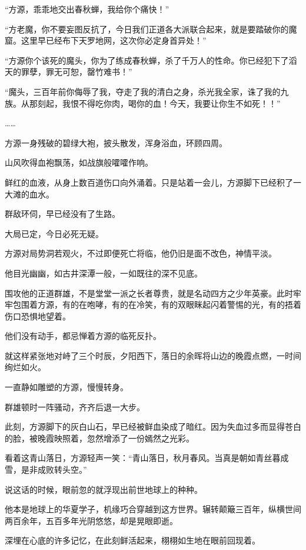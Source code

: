 
\begin{this_body}

“方源，乖乖地交出春秋蝉，我给你个痛快！”

“方老魔，你不要妄图反抗了，今日我们正道各大派联合起来，就是要踏破你的魔窟。这里早已经布下天罗地网，这次你必定身首异处！”

“方源你个该死的魔头，你为了练成春秋蝉，杀了千万人的性命。你已经犯下了滔天的罪孽，罪无可恕，罄竹难书！”

“魔头，三百年前你侮辱了我，夺走了我的清白之身，杀光我全家，诛了我的九族。从那刻起，我恨不得吃你肉，喝你的血！今天，我要让你生不如死！！”

……

方源一身残破的碧绿大袍，披头散发，浑身浴血，环顾四周。

山风吹得血袍飘荡，如战旗般嚯嚯作响。

鲜红的血液，从身上数百道伤口向外涌着。只是站着一会儿，方源脚下已经积了一大滩的血水。

群敌环伺，早已经没有了生路。

大局已定，今日必死无疑。

方源对局势洞若观火，不过即便死亡将临，他仍旧是面不改色，神情平淡。

他目光幽幽，如古井深潭一般，一如既往的深不见底。

围攻他的正道群雄，不是堂堂一派之长者尊贵，就是名动四方之少年英豪。此时牢牢包围着方源，有的在咆哮，有的在冷笑，有的双眼眯起闪着警惕的光，有的捂着伤口恐惧地望着。

他们没有动手，都忌惮着方源的临死反扑。

就这样紧张地对峙了三个时辰，夕阳西下，落日的余晖将山边的晚霞点燃，一时间绚烂如火。

一直静如雕塑的方源，慢慢转身。

群雄顿时一阵骚动，齐齐后退一大步。

此刻，方源脚下的灰白山石，早已经被鲜血染成了暗红。因为失血过多而显得苍白的脸，被晚霞映照着，忽然增添了一份嫣然之光彩。

看着这青山落日，方源轻声一笑：“青山落日，秋月春风。当真是朝如青丝暮成雪，是非成败转头空。”

说这话的时候，眼前忽的就浮现出前世地球上的种种。

他本是地球上的华夏学子，机缘巧合穿越到这方世界。辗转颠簸三百年，纵横世间两百余年，五百多年光阴悠悠，却是晃眼即逝。

深埋在心底的许多记忆，在此刻鲜活起来，栩栩如生地在眼前回现着。


\end{this_body}
